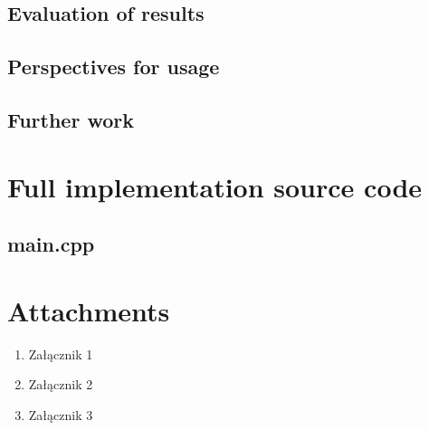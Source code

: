 \documentclass[12pt]{report}
\begin{document}
\section{Evaluation of results} 

\section{Perspectives for usage }



\section{Further work}

 
\chapter{Full implementation source code} \label{rozdzial.kod}
\section{main.cpp}

\pagebreak 



\printbibliography[heading=bibintoc]

\listoffigures

\listoftables

\chapter*{Attachments}
\begin{enumerate}
\item Załącznik 1
\item Załącznik 2
\item Załącznik 3
\end{enumerate}
\end{document}
